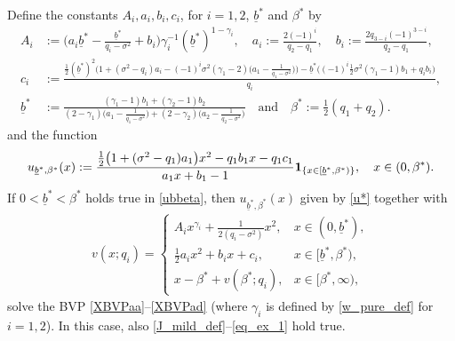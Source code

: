 \documentclass[10pt,a4paper]{amsart}
\def\ub{\underline{b}}
\begin{document}
\begin{proposition} \label{thm:mildvalue} 
Define the constants $A_i,a_i,b_i,c_i$, for $i=1,2$, $\ub^*$ and $\beta^*$ by 
\begin{align}
A_i &:= \Big(a_i \ub^* -\frac{\ub^*}{q_i-\sigma^2} + b_i \Big) \gamma_i^{-1} (\ub^*)^{1-\gamma_i}, \quad a_i := \frac{2 (-1)^i}{q_2-q_1}, \quad 
b_i := \frac{2 q_{3-i} (-1)^{3-i}}{q_2-q_1}, \label{Aiaibi}\\
c_i &:= \frac{\tfrac12 (\ub^*)^2 \big(1 + (\sigma^2 - q_i) a_i -(-1)^i \sigma^2 (\gamma_1 - 2) \big(a_1 -\frac{1}{q_1-\sigma^2}\big) \big) - \ub^* \big((-1)^i \tfrac12 \sigma^2 (\gamma_1 - 1) b_1 + q_i b_i\big)}{q_i}, \label{ci}\\
\ub^* &:=\frac{(\gamma_1-1)b_1+ (\gamma_2-1)b_2}{(2-\gamma_1) \big(a_1-\frac{1}{q_1-\sigma^2}\big) + (2-\gamma_2) \big(a_2-\frac{1}{q_2-\sigma^2}\big)} 
\quad \text{and} \quad 
\beta^* := \tfrac{1}{2} (q_1 + q_2).\label{ubbeta}
\end{align}
and the function
\begin{equation} \label{u*}
u_{\ub^*,\beta^*}(x) 
:= \frac{\tfrac12 \big(1 + (\sigma^2 - q_1) a_1 \big) x^2 - q_1 b_1 x - q_1 c_1}{a_1 x + b_1 - 1} {\bf 1}_{\{x \in [\ub^*,\beta^*)\}}, \quad x \in (0,\beta^*).
\end{equation}
If $0 < \ub^* < \beta^*$ holds true in \eqref{ubbeta}, then $u_{\ub^*,\beta^*}(x)$ given by \eqref{u*} together with
\begin{align}\label{candv}
v(x;q_i)= \begin{cases}
A_i x^{\gamma_i}+\frac{1}{2(q_i-\sigma^2)} x^2, & x\in (0,\ub^*), \\
\frac{1}{2} a_i x^2 + b_i x + c_i, 
& x \in [\ub^*,\beta^*), \\
x - \beta^* + v(\beta^*;q_i), & x \in [\beta^*,\infty),
\end{cases}
\end{align} 
solve the BVP \eqref{XBVPaa}--\eqref{XBVPad} (where $\gamma_i$ is defined by \eqref{w_pure_def} for $i=1,2$). 
In this case, also \eqref{J_mild_def}--\eqref{eq_ex_1} hold true. 
\end{proposition}
\end{document}
